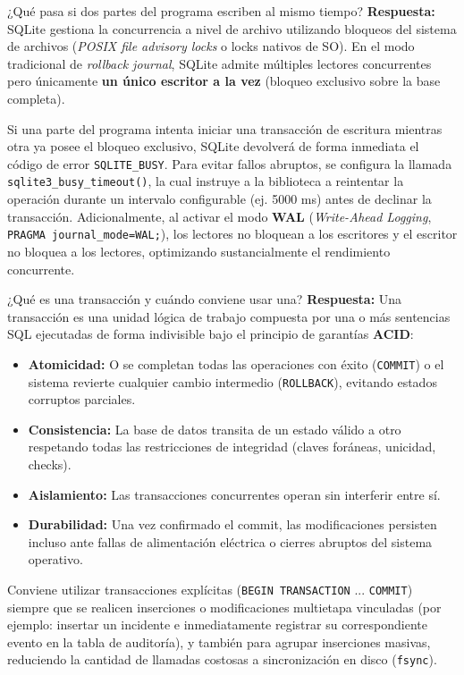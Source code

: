 \documentclass[10pt,a4paper]{article}
\begin{document}
\begin{pregunta}{¿Qué pasa si dos partes del programa escriben al mismo tiempo?}
    \textbf{Respuesta:} SQLite gestiona la concurrencia a nivel de archivo utilizando bloqueos del sistema de archivos (\textit{POSIX file advisory locks} o locks nativos de SO). En el modo tradicional de \textit{rollback journal}, SQLite admite múltiples lectores concurrentes pero únicamente \textbf{un único escritor a la vez} (bloqueo exclusivo sobre la base completa).
    
    Si una parte del programa intenta iniciar una transacción de escritura mientras otra ya posee el bloqueo exclusivo, SQLite devolverá de forma inmediata el código de error \texttt{SQLITE\_BUSY}. Para evitar fallos abruptos, se configura la llamada \texttt{sqlite3\_busy\_timeout()}, la cual instruye a la biblioteca a reintentar la operación durante un intervalo configurable (ej. 5000 ms) antes de declinar la transacción. Adicionalmente, al activar el modo \textbf{WAL} (\textit{Write-Ahead Logging}, \texttt{PRAGMA journal\_mode=WAL;}), los lectores no bloquean a los escritores y el escritor no bloquea a los lectores, optimizando sustancialmente el rendimiento concurrente.
\end{pregunta}

\begin{pregunta}{¿Qué es una transacción y cuándo conviene usar una?}
    \textbf{Respuesta:} Una transacción es una unidad lógica de trabajo compuesta por una o más sentencias SQL ejecutadas de forma indivisible bajo el principio de garantías \textbf{ACID}:
    \begin{itemize}[leftmargin=*]
        \item \textbf{Atomicidad:} O se completan todas las operaciones con éxito (\texttt{COMMIT}) o el sistema revierte cualquier cambio intermedio (\texttt{ROLLBACK}), evitando estados corruptos parciales.
        \item \textbf{Consistencia:} La base de datos transita de un estado válido a otro respetando todas las restricciones de integridad (claves foráneas, unicidad, checks).
        \item \textbf{Aislamiento:} Las transacciones concurrentes operan sin interferir entre sí.
        \item \textbf{Durabilidad:} Una vez confirmado el commit, las modificaciones persisten incluso ante fallas de alimentación eléctrica o cierres abruptos del sistema operativo.
    \end{itemize}
    Conviene utilizar transacciones explícitas (\texttt{BEGIN TRANSACTION} ... \texttt{COMMIT}) siempre que se realicen inserciones o modificaciones multietapa vinculadas (por ejemplo: insertar un incidente e inmediatamente registrar su correspondiente evento en la tabla de auditoría), y también para agrupar inserciones masivas, reduciendo la cantidad de llamadas costosas a sincronización en disco (\texttt{fsync}).
\end{pregunta}
\end{document}
